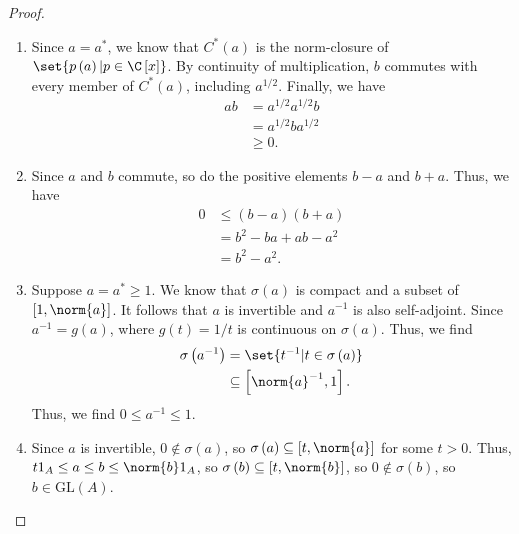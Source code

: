 \documentclass[10pt]{mypackage}
\newcommand{\GL}{\text{GL}}
\begin{document}
\begin{proof}\hfill
  \begin{enumerate}[(1)]
    \item Since $a = a^{\ast}$, we know that $C^{\ast}\left(a\right)$ is the norm-closure of $\set{p\left(a\right) | p\in \C\left[x\right]}$. By continuity of multiplication, $b$ commutes with every member of $C^{\ast}\left(a\right)$, including $a^{1/2}$. Finally, we have
      \begin{align*}
        ab &= a^{1/2}a^{1/2}b\\
           &= a^{1/2}ba^{1/2}\\
           &\geq 0.
      \end{align*}
    \item Since $a$ and $b$ commute, so do the positive elements $b-a$ and $b+a$. Thus, we have
      \begin{align*}
        0 &\leq \left(b-a\right)\left(b+a\right)\\
          &= b^2 - ba + ab - a^2\\
          &= b^2 - a^2.
      \end{align*}
    \item Suppose $a = a^{\ast}\geq 1$. We know that $\sigma\left(a\right)$ is compact and a subset of $\left[1,\norm{a}\right]$. It follows that $a$ is invertible and $a^{-1}$ is also self-adjoint. Since $a^{-1} = g(a)$, where $g(t) = 1/t$ is continuous on $\sigma\left(a\right)$. Thus, we find
      \begin{align*}
        \sigma\left(a^{-1}\right) &= \set{t^{-1} | t\in\sigma\left(a\right)}\\
                                  &\subseteq \left[\norm{a}^{-1},1\right].
      \end{align*}
      Thus, we find $0 \leq a^{-1}\leq 1$.
    \item Since $a$ is invertible, $0\notin \sigma\left(a\right)$, so $\sigma\left(a\right) \subseteq \left[t,\norm{a}\right]$ for some $t > 0$. Thus, $t1_A \leq a \leq b \leq \norm{b}1_A$, so $\sigma\left(b\right) \subseteq \left[t,\norm{b}\right]$, so $0\notin \sigma\left(b\right)$, so $b\in \GL\left(A\right)$.\newline


\end{enumerate}
\end{proof}
\end{document}
